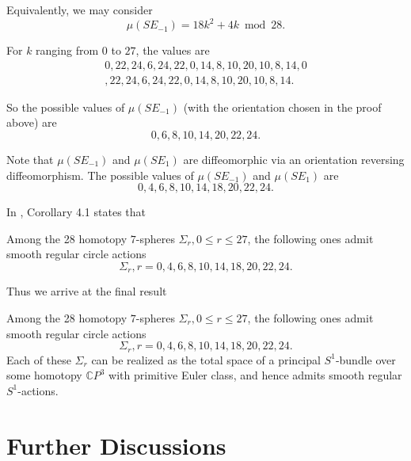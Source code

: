 \documentclass[twoside]{article}
\begin{document}
Equivalently, we may consider
\[
\mu(SE_{-1}) = 18k^2 + 4k\bmod 28. 
\]

For $k$ ranging from $0$ to $27$, the values are
\begin{gather*}
0,22,24,6,24,22,0,14,8,10,20,10,8,14,0 \\
,22,24,6,24,22,0,14,8,10,20,10,8,14. 
\end{gather*}

So the possible values of $\mu(SE_{-1})$ 
(with the orientation chosen in the proof above) are 
\[
0,6,8,10,14,20,22,24. 
\]

Note that $\mu(SE_{-1})$ and $\mu(SE_{1})$ are diffeomorphic via an orientation reversing diffeomorphism. The possible values of $\mu(SE_{-1})$ and $\mu(SE_{1})$ are 
\[
0,4,6,8,10,14,18,20,22,24. 
\]

In \cite{yijiang}, Corollary 4.1 states that
\begin{prop}
	Among the 28 homotopy $7$-spheres $\Sigma_r,0 \leq r \leq 27$,  the following ones admit smooth regular circle actions
	\[
	\Sigma_r,r = 0,4,6,8,10,14,18,20,22,24. 
	\]
\end{prop}

Thus we arrive at the final result
\begin{thm}
	Among the 28 homotopy $7$-spheres $\Sigma_r,0 \leq r \leq 27$,  the following ones admit smooth regular circle actions
	\[
	\Sigma_r,r = 0,4,6,8,10,14,18,20,22,24. 
	\]
	Each of these $\Sigma_r$ can be realized as the total space of  a principal $S^1$-bundle over some homotopy $\mathbb{C}P^3$ with primitive Euler class, and hence admits smooth regular $S^1$-actions. 
\end{thm}










































\section{Further Discussions}
\end{document}
